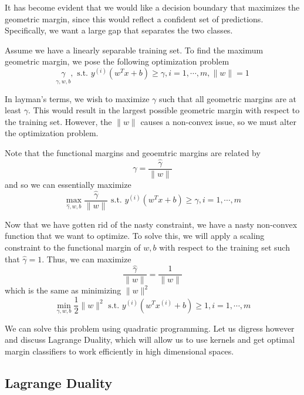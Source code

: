 \documentclass[12pt]{scrartcl}
\begin{document}
It has become evident that we would like a decision boundary that maximizes the
geometric margin, since this would reflect a confident set of predictions.
Specifically, we want a large gap that separates the two classes.

\begin{example}
    Assume we have a linearly separable training set. To find the maximum geometric margin, we pose the following optimization problem
    \[\underset{\gamma, w, b}{\gamma}, \text{ s.t. } y^{(i)} (w^Tx + b) \geq \gamma, i = 1, \cdots, m, \lVert w \rVert = 1\]
\end{example}

In layman's terms, we wish to maximize $\gamma$ such that all geometric margins
are at least $\gamma$. This would result in the largest possible geometric
margin with respect to the training set. However, the $\lVert w \rVert$ causes
a non-convex issue, so we must alter the optimization problem.

\begin{note}
    Note that the functional margins and geoemtric margins are related by
    \[\gamma = \frac{\hat \gamma}{\lVert w \rVert}\]
    and so we can essentially maximize
    \[\underset{\hat \gamma, w, b}{\max } \frac{\hat \gamma}{\lVert w \rVert} \text{ s.t. } y^{(i)}(w^Tx + b) \geq \hat \gamma, i = 1, \cdots, m\]
\end{note}
Now that we have gotten rid of the nasty constraint, we have a nasty non-convex function that we want to optimize. To solve this, we will apply a scaling constraint to the functional margin of $w, b$ with respect to the training set such that
$\hat \gamma = 1$. Thus, we can maximize
\[\frac{\hat \gamma}{\lVert w \rVert} = \frac{1}{\lVert w \rVert}\] which is the same as minimizing $\lVert w \rVert ^2$
\[\underset{\gamma, w, b}{\min} \frac{1}{2}\lVert w \rVert^2 \text{ s.t. } y^{(i)} (w^Tx^{(i)} + b) \geq 1, i = 1, \cdots, m\]

We can solve this problem using quadratic programming. Let us digress however
and discuss Lagrange Duality, which will allow us to use kernels and get
optimal margin classifiers to work efficiently in high dimensional spaces.

\subsection{Lagrange Duality}
\end{document}
